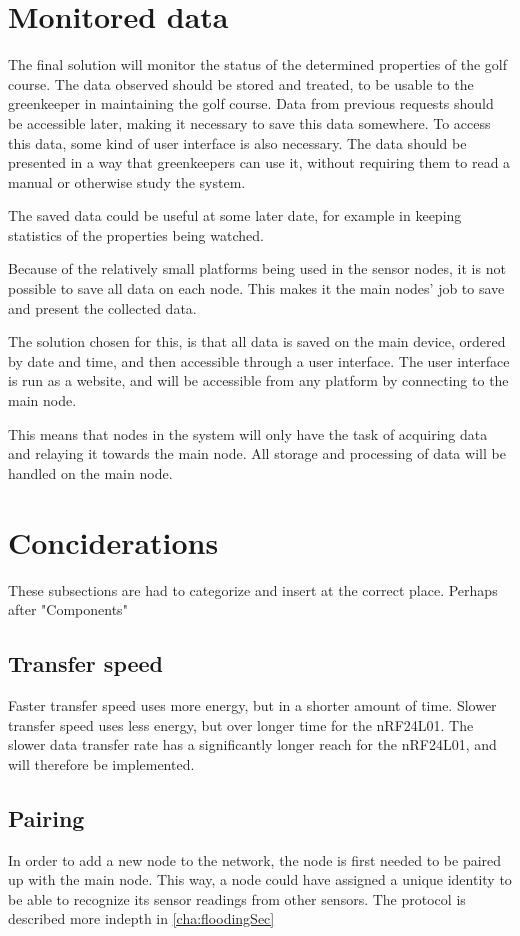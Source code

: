 \section{Monitored data}
The final solution will monitor the status of the determined properties of the golf course. The data observed should be stored and treated, to be usable to the greenkeeper in maintaining the golf course. Data from previous requests should be accessible later, making it necessary to save this data somewhere. To access this data, some kind of user interface is also necessary. The data should be presented in a way that greenkeepers can use it, without requiring them to read a manual or otherwise study the system. 

The saved data could be useful at some later date, for example in keeping  statistics of the properties being watched.

Because of the relatively small platforms being used in the sensor nodes, it is not possible to save all data on each node. This makes it the main nodes' job to save and present the collected data.

The solution chosen for this, is that all data is saved on the main device, ordered by date and time, and then accessible through a user interface. The user interface is run as a website, and will be accessible from any platform by connecting to the main node.

This means that nodes in the system will only have the task of acquiring data and relaying it towards the main node. All storage and processing of data will be handled on the main node.

\section{Conciderations}
These subsections are had to categorize and insert at the correct place. Perhaps after "Components"
\subsection{Transfer speed}
Faster transfer speed uses more energy, but in a shorter amount of time. Slower transfer speed uses less energy, but over longer time for the nRF24L01. The slower data transfer rate has a significantly longer reach for the nRF24L01, and will therefore be implemented. 

\subsection{Pairing}
In order to add a new node to the network, the node is first needed to be paired up with the main node.
This way, a node could have assigned a unique identity to be able to recognize its sensor readings from other sensors. 
The protocol is described more indepth in \ref{cha:floodingSec}
